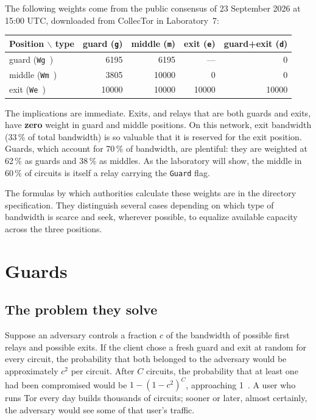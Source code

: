 The following weights come from the public consensus of 23 September 2026 at 15:00 UTC, downloaded from CollecTor in Laboratory~7:
\begin{center}
\begin{tabular}{lrrrr}
\toprule
Position $\backslash$ type & guard (\texttt{g}) & middle (\texttt{m}) & exit (\texttt{e}) & guard+exit (\texttt{d}) \\
\midrule
guard (\texttt{Wg\,}) & 6195 & 6195 & --- & 0 \\
middle (\texttt{Wm\,}) & 3805 & 10000 & 0 & 0 \\
exit (\texttt{We\,}) & 10000 & 10000 & 10000 & 10000 \\
\bottomrule
\end{tabular}
\end{center}
The implications are immediate. Exits, and relays that are both guards and exits, have \textbf{zero} weight in guard and middle positions. On this network, exit bandwidth (33\,\% of total bandwidth) is so valuable that it is reserved for the exit position. Guards, which account for 70\,\% of bandwidth, are plentiful: they are weighted at 62\,\% as guards and 38\,\% as middles. As the laboratory will show, the middle in 60\,\% of circuits is itself a relay carrying the \texttt{Guard} flag.

The formulas by which authorities calculate these weights are in the directory specification. They distinguish several cases depending on which type of bandwidth is scarce and seek, wherever possible, to equalize available capacity across the three positions.

\section{Guards}\label{sec:guard}

\subsection{The problem they solve}

Suppose an adversary controls a fraction $c$ of the bandwidth of possible first relays and possible exits. If the client chose a fresh guard and exit at random for every circuit, the probability that both belonged to the adversary would be approximately $c^2$ per circuit. After $C$ circuits, the probability that at least one had been compromised would be $1 - (1 - c^2)^C$, approaching 1~. A user who runs Tor every day builds thousands of circuits; sooner or later, almost certainly, the adversary would see some of that user's traffic.

